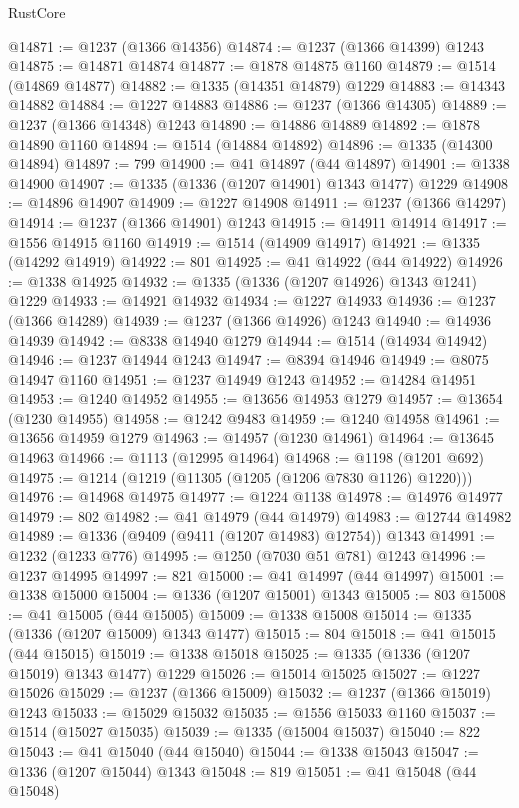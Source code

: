\begin{lexlean}{RustCore}
\begin{coremodule}
@14871 := @1237 (@1366 @14356)
@14874 := @1237 (@1366 @14399) @1243
@14875 := @14871 @14874
@14877 := @1878 @14875 @1160
@14879 := @1514 (@14869 @14877)
@14882 := @1335 (@14351 @14879) @1229
@14883 := @14343 @14882
@14884 := @1227 @14883
@14886 := @1237 (@1366 @14305)
@14889 := @1237 (@1366 @14348) @1243
@14890 := @14886 @14889
@14892 := @1878 @14890 @1160
@14894 := @1514 (@14884 @14892)
@14896 := @1335 (@14300 @14894)
@14897 := 799
@14900 := @41 @14897 (@44 @14897)
@14901 := @1338 @14900
@14907 := @1335 (@1336 (@1207 @14901) @1343 @1477) @1229
@14908 := @14896 @14907
@14909 := @1227 @14908
@14911 := @1237 (@1366 @14297)
@14914 := @1237 (@1366 @14901) @1243
@14915 := @14911 @14914
@14917 := @1556 @14915 @1160
@14919 := @1514 (@14909 @14917)
@14921 := @1335 (@14292 @14919)
@14922 := 801
@14925 := @41 @14922 (@44 @14922)
@14926 := @1338 @14925
@14932 := @1335 (@1336 (@1207 @14926) @1343 @1241) @1229
@14933 := @14921 @14932
@14934 := @1227 @14933
@14936 := @1237 (@1366 @14289)
@14939 := @1237 (@1366 @14926) @1243
@14940 := @14936 @14939
@14942 := @8338 @14940 @1279
@14944 := @1514 (@14934 @14942)
@14946 := @1237 @14944 @1243
@14947 := @8394 @14946
@14949 := @8075 @14947 @1160
@14951 := @1237 @14949 @1243
@14952 := @14284 @14951
@14953 := @1240 @14952
@14955 := @13656 @14953 @1279
@14957 := @13654 (@1230 @14955)
@14958 := @1242 @9483
@14959 := @1240 @14958
@14961 := @13656 @14959 @1279
@14963 := @14957 (@1230 @14961)
@14964 := @13645 @14963
@14966 := @1113 (@12995 @14964)
@14968 := @1198 (@1201 @692)
@14975 := @1214 (@1219 (@11305 (@1205 (@1206 @7830 @1126) @1220)))
@14976 := @14968 @14975
@14977 := @1224 @1138
@14978 := @14976 @14977
@14979 := 802
@14982 := @41 @14979 (@44 @14979)
@14983 := @12744 @14982
@14989 := @1336 (@9409 (@9411 (@1207 @14983) @12754)) @1343
@14991 := @1232 (@1233 @776)
@14995 := @1250 (@7030 @51 @781) @1243
@14996 := @1237 @14995
@14997 := 821
@15000 := @41 @14997 (@44 @14997)
@15001 := @1338 @15000
@15004 := @1336 (@1207 @15001) @1343
@15005 := 803
@15008 := @41 @15005 (@44 @15005)
@15009 := @1338 @15008
@15014 := @1335 (@1336 (@1207 @15009) @1343 @1477)
@15015 := 804
@15018 := @41 @15015 (@44 @15015)
@15019 := @1338 @15018
@15025 := @1335 (@1336 (@1207 @15019) @1343 @1477) @1229
@15026 := @15014 @15025
@15027 := @1227 @15026
@15029 := @1237 (@1366 @15009)
@15032 := @1237 (@1366 @15019) @1243
@15033 := @15029 @15032
@15035 := @1556 @15033 @1160
@15037 := @1514 (@15027 @15035)
@15039 := @1335 (@15004 @15037)
@15040 := 822
@15043 := @41 @15040 (@44 @15040)
@15044 := @1338 @15043
@15047 := @1336 (@1207 @15044) @1343
@15048 := 819
@15051 := @41 @15048 (@44 @15048)

\end{coremodule}
\end{lexlean}
